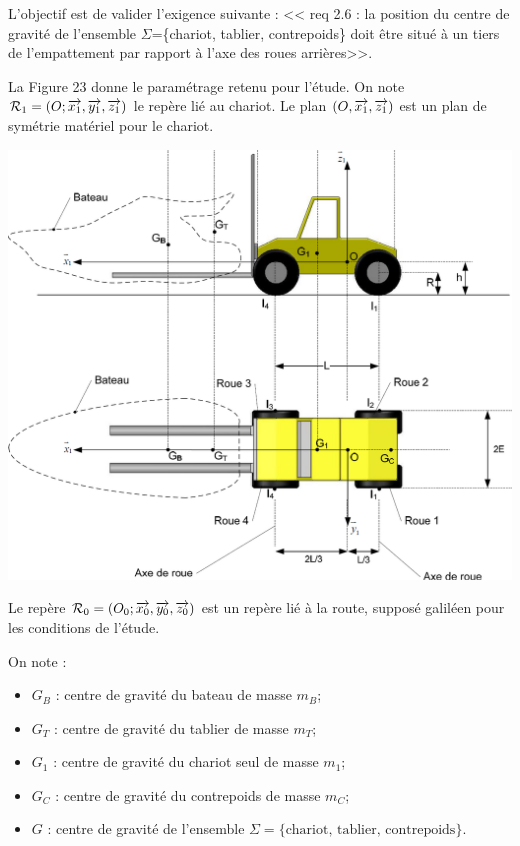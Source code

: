 \documentclass[10pt,fleqn]{article} %
\begin{document}
\begin{multicols}{2}
\begin{obj}
L'objectif est de valider l'exigence suivante : << req 2.6 : la position du centre de gravité de l'ensemble $\Sigma$=\{chariot, tablier, contrepoids\} doit être situé à un tiers de l'empattement par rapport à l'axe des roues arrières>>. 
\end{obj}
La Figure 23 donne le paramétrage retenu pour l’étude. On note $\mathcal{R}_{1}=\left(O;\overrightarrow{x_1},\overrightarrow{y_1},\overrightarrow{z_1} \right)$ le repère lié au chariot. Le plan $\left(O,\overrightarrow{x_1},\overrightarrow{z_1} \right)$ est un plan de symétrie matériel pour le chariot.

\begin{center}
\includegraphics[width=\linewidth]{images/fig_03}
\end{center}

Le repère  $\mathcal{R}_{0}=\left(O_0;\overrightarrow{x_0},\overrightarrow{y_0},\overrightarrow{z_0} \right)$ est un repère lié à la route, supposé galiléen pour les conditions de l’étude.

On note : 
\begin{itemize}
\item $G_B$ : centre de gravité du bateau de masse $m_B$;
\item $G_T$ : centre de gravité du tablier de masse $m_T$;
\item $G_1$ : centre de gravité du chariot seul de masse $m_1$;
\item $G_C$ : centre de gravité du contrepoids de masse $m_C$;
\item $G$ : centre de gravité de l'ensemble $\Sigma =  \{\text{chariot, tablier, contrepoids}\}$.
\end{itemize}


\end{multicols}
\end{document}
